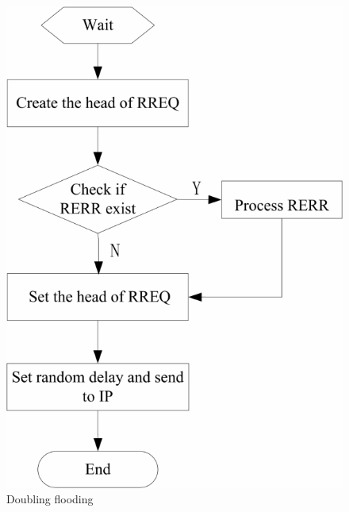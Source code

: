 \documentclass[]{nsm-thesis}
\begin{document}
\begin{figure}[h]
\graphicspath{{/image/}} %
\centering
\includegraphics[scale=0.4]{image/Doubling flooding.png} %
\caption{Doubling flooding \cite{7879681}}
\label{fig:mesh2} %
\end{figure}
\clearpage
\end{document}
